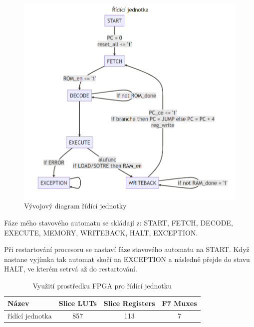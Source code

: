 \documentclass[FM,BP]{tulthesis}
\newcommand{\argument}[1]{{\ttfamily\color{\tulcolor}#1}}
\begin{document}
\begin{figure}[h]
    \centering
    \includegraphics[scale=0.45]{assets/Řídící jednotka.png}
    \caption{Vývojový diagram řídící jednotky}
    \label{fig:control_cycle}
\end{figure}

Fáze mého stavového automatu se skládají z: 
\argument{START}, 
\argument{FETCH}, 
\argument{DECODE}, 
\argument{EXECUTE}, 
\argument{MEMORY}, 
\argument{WRITEBACK}, 
\argument{HALT}, 
\argument{EXCEPTION}.

Při restartování procesoru se nastaví fáze stavového automatu na \argument{START}. Když nastane vyjímka tak automat skočí na \argument{EXCEPTION} a následně přejde do stavu \argument{HALT}, ve kterém setrvá až do restartování. 

\begin{table}[h]
    \caption{Využití prostředku FPGA pro řídící jednotku}
    \label{table:CU_resources}
    \begin{center}
        \begin{tabular}{|l|c|c|c|}
        \hline
        \textbf{Název} & 
        \textbf{Slice LUTs} & 
        \textbf{Slice Registers} & 
        \textbf{F7 Muxes} \\
        \hline
        řídící jednotka & 857 & 113 & 7 \\
        \hline
        \end{tabular}
    \end{center}
\end{table}
\end{document}
